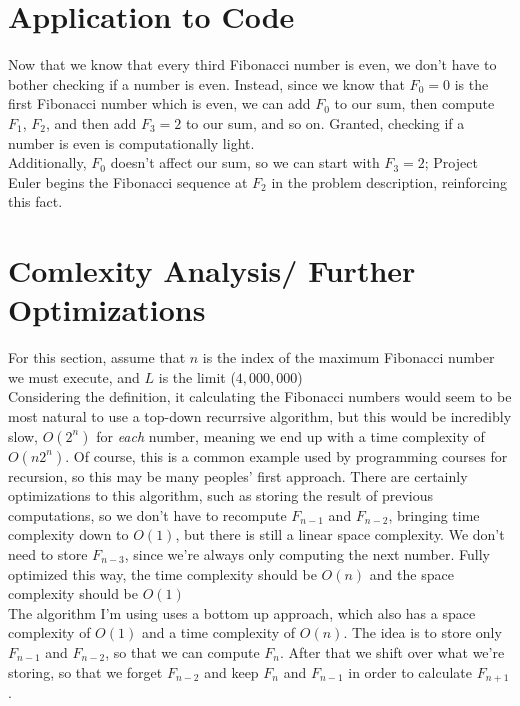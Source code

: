 \documentclass[11pt, oneside]{article}   	%
\begin{document}
\section{Application to Code}
	Now that we know that every third Fibonacci number is even, we don't have to bother checking if a number is even. Instead, since we know that $F_0 = 0$ is the first Fibonacci number which is even, we can add $F_0$ to our sum, then compute $F_1$, $F_2$, and then add $F_3=2$ to our sum, and so on. Granted, checking if a number is even is computationally light.\\

	Additionally, $F_0$ doesn't affect our sum, so we can start with $F_3=2$; Project Euler begins the Fibonacci sequence at $F_2$ in the problem description, reinforcing this fact.  


\section{Comlexity Analysis/ Further Optimizations}
	For this section, assume that $n$ is the index of the maximum Fibonacci number we must execute, and $L$ is the limit ($4,000,000$)\\

	Considering the definition, it calculating the Fibonacci numbers would seem to be most natural to use a top-down recurrsive algorithm, but this would be incredibly slow, $O(2^n)$ for \textit{each} number, meaning we end up with a time complexity of $O(n2^n)$. Of course, this is a common example used by programming courses for recursion, so this may be many peoples' first approach. There are certainly optimizations to this algorithm, such as storing the result of previous computations, so we don't have to recompute $F_{n-1}$ and $F_{n-2}$, bringing time complexity down to $O(1)$, but there is still a linear space complexity. We don't need to store $F_{n-3}$, since we're always only computing the next number. Fully optimized this way, the time complexity should be $O(n)$ and the space complexity should be $O(1)$\\

	The algorithm I'm using uses a bottom up approach, which also has a space complexity of $O(1)$ and a time complexity of $O(n)$. The idea is to store only $F_{n-1}$ and $F_{n-2}$, so that we can compute $F_n$. After that we shift over what we're storing, so that we forget $F_{n-2}$ and keep $F_n$ and $F_{n-1}$ in order to calculate $F_{n+1}$.
\end{document}

